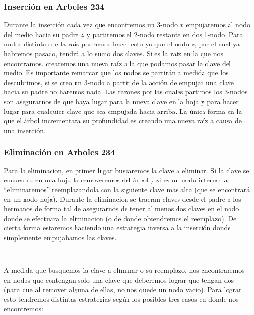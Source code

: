 \subsubsection{Inserci\'on en Arboles 234}

Durante la inserci\'on cada vez que encontremos un 3-nodo $x$ empujaremos al nodo del medio hacia su padre $z$ y partiremos el 2-nodo restante en dos 1-nodo. Para nodos distintos de la ra\'iz podremos hacer esto ya que el nodo $z$, por el cual ya habremos pasado, tendr\'a a lo sumo dos claves.  Si es la ra\'iz en la que nos encontramos, crearemos una nueva ra\'iz a la que podamos pasar la clave del medio. Es importante remarcar que los nodos se partir\'an a medida que los descubrimos, si se creo un 3-nodo a partir de la acci\'on de empujar una clave hacia su padre no haremos nada. Las razones por las cuales partimos los 3-nodos son asegurarnos de que haya lugar para la nueva clave en la hoja y para hacer lugar para cualquier clave que sea empujada hacia arriba. La \'unica forma en la que el \'arbol incrementara su profundidad es creando una nueva ra\'iz a causa de una inserci\'on.

\subsubsection{Eliminaci\'on en Arboles 234}

Para la eliminacion, en primer lugar buscaremos la clave a eliminar. Si la clave se encuentra en una hoja la removeremos del \'arbol y si es un nodo interno la ``eliminaremos'' reemplazandola con la siguiente clave mas alta (que se encontrar\'a en un nodo hoja).
Durante la eliminacion se traeran claves desde el padre o los hermanos de forma tal de asegurarnos de tener al menos  dos claves en el nodo donde se efectuara la eliminacion (o de donde obtendremos el reemplazo).
De cierta forma estaremos haciendo una estrategia inversa a la inserci\'on donde simplemente empujabamos las claves.

~

A medida que busquemos la clave a eliminar o su reemplazo, nos encontraremos en nodos que contengan solo una clave que deberemos lograr que tengan dos (para que al remover alguna de ellas, no nos quede un nodo vacio). Para lograr esto tendremos distintas estrategias seg\'un los posibles tres casos en donde nos encontremos:

